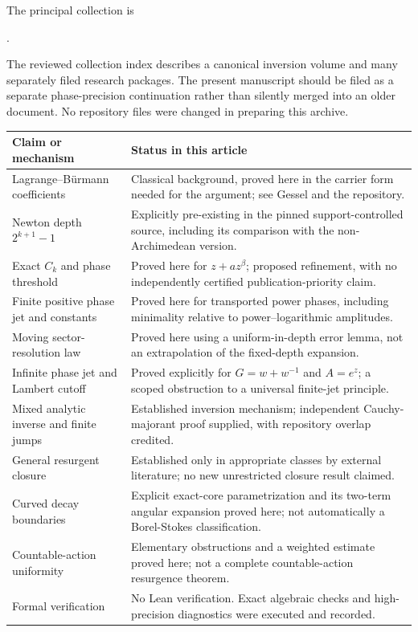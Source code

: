 \documentclass[11pt,a4paper]{article}
\theoremstyle{definition}
\theoremstyle{remark}
\numberwithin{equation}{section}
\begin{document}
The principal collection is
\begin{center}\small
{}.
\end{center}
The reviewed collection index describes a canonical inversion volume and many separately filed research packages. The present manuscript should be filed as a separate phase-precision continuation rather than silently merged into an older document. No repository files were changed in preparing this archive.

\begin{longtable}{@{}>{\raggedright\arraybackslash}p{}>{\raggedright\arraybackslash}p{}@{}}
\toprule
Claim or mechanism & Status in this article\\
\midrule
\endhead
Lagrange--B\"urmann coefficients & Classical background, proved here in the carrier form needed for the argument; see Gessel and the repository.\\
Newton depth $2^{k+1}-1$ & Explicitly pre-existing in the pinned support-controlled source, including its comparison with the non-Archimedean version.\\
Exact $C_k$ and phase threshold & Proved here for $z+az^\beta$; proposed refinement, with no independently certified publication-priority claim.\\
Finite positive phase jet and constants & Proved here for transported power phases, including minimality relative to power--logarithmic amplitudes.\\
Moving sector-resolution law & Proved here using a uniform-in-depth error lemma, not an extrapolation of the fixed-depth expansion.\\
Infinite phase jet and Lambert cutoff & Proved explicitly for $G=w+w^{-1}$ and $A=e^z$; a scoped obstruction to a universal finite-jet principle.\\
Mixed analytic inverse and finite jumps & Established inversion mechanism; independent Cauchy-majorant proof supplied, with repository overlap credited.\\
General resurgent closure & Established only in appropriate classes by external literature; no new unrestricted closure result claimed.\\
Curved decay boundaries & Explicit exact-core parametrization and its two-term angular expansion proved here; not automatically a Borel-Stokes classification.\\
Countable-action uniformity & Elementary obstructions and a weighted estimate proved here; not a complete countable-action resurgence theorem.\\
Formal verification & No Lean verification. Exact algebraic checks and high-precision diagnostics were executed and recorded.\\
\bottomrule
\end{longtable}
\end{document}
